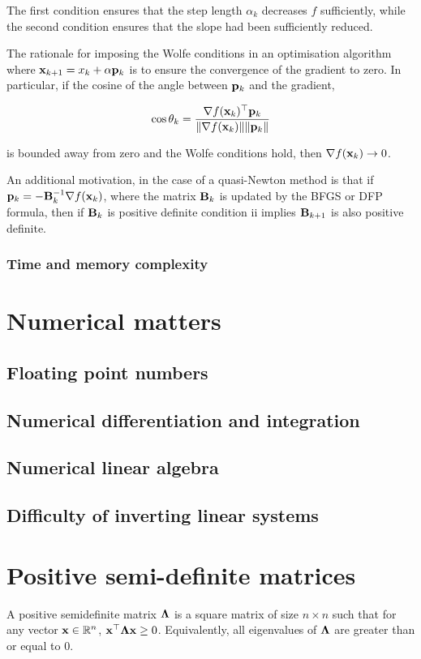 \documentclass{article}[12pt]
\begin{document}
The first condition ensures that the step length $\alpha_k$ decreases $f$ sufficiently, while the second condition
ensures that the slope had been sufficiently reduced.

The rationale for imposing the Wolfe conditions in an optimisation algorithm where
${\bf x}_{k+1} = x_k + \alpha {\bf p}_k$ is to ensure the convergence of the gradient to zero. In particular, if the
cosine of the angle between ${\bf p}_k$ and the gradient,

$$
\cos \theta_k = \frac{\nabla f({\bf x}_k)^\top {\bf p}_k}{\|\nabla f({\bf x}_k)\| \|{\bf p}_k\|}
$$

is bounded away from zero and the Wolfe conditions hold, then $\nabla f({\bf x}_k) \to 0$.

An additional motivation, in the case of a quasi-Newton method is that if ${\bf p}_k = - {\bf B}_k^{-1} \nabla f({\bf x}_k)$,
where the matrix ${\bf B}_k$ is updated by the BFGS or DFP formula, then if ${\bf B}_k$ is positive definite condition ii
implies ${\bf B}_{k+1}$ is also positive definite.

\subsubsection{Time and memory complexity}

\section{Numerical matters}

\subsection{Floating point numbers}
\subsection{Numerical differentiation and integration}
\subsection{Numerical linear algebra}
\subsection{Difficulty of inverting linear systems}

\section{Positive semi-definite matrices}
A positive semidefinite matrix ${\boldsymbol \Lambda}$ is a square matrix of size $n \times n$ such that for any vector
${\bf x} \in {\mathbb{R}}^n$, ${\bf x}^\top {\boldsymbol\Lambda} {\bf x} \geq 0$. Equivalently, all eigenvalues of ${\boldsymbol \Lambda}$ are greater than or 
equal to 0.
\end{document}
